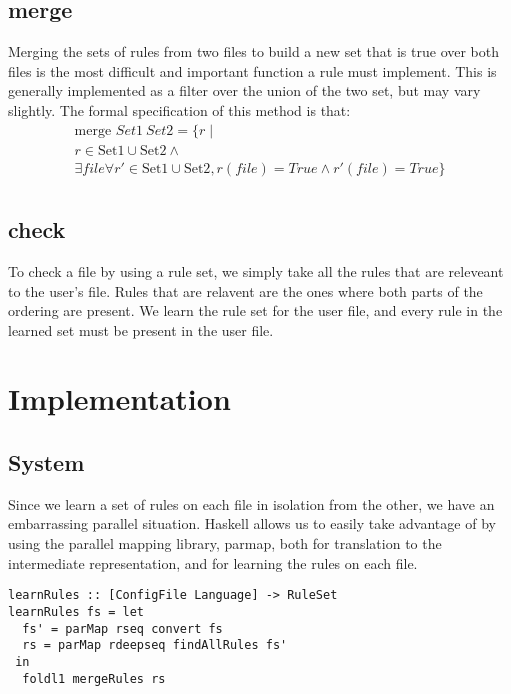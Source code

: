 \subsection{merge}
  Merging the sets of rules from two files to build a new set that is true over both files is the most difficult and important function a rule must implement.
  This is generally implemented as a filter over the union of the two set, but may vary slightly.
  The formal specification of this method is that:
  \begin{multline*}
  \text{merge } Set1 \: Set2= \{r \mid \\
    r \in \text{Set1} \cup \text{Set2} \land \\
    \exists file \forall r' \in \text{Set1} \cup \text{Set2}, r(file) = True \land r'(file) = True \} \\
  \end{multline*}

\subsection{check}
  To check a file by using a rule set, we simply take all the rules that are releveant to the user's file.
  Rules that are relavent are the ones where both parts of the ordering are present.
  We learn the rule set for the user file, and every rule in the learned set must be present in the user file.

\section{Implementation}

\subsection{System}
Since we learn a set of rules on each file in isolation from the other, we have an embarrassing parallel situation.
Haskell allows us to easily take advantage of by using the parallel mapping library, parmap, both for translation to the intermediate representation, and for learning the rules on each file.

\begin{lstlisting}
learnRules :: [ConfigFile Language] -> RuleSet
learnRules fs = let
  fs' = parMap rseq convert fs
  rs = parMap rdeepseq findAllRules fs'
 in
  foldl1 mergeRules rs
\end{lstlisting}

